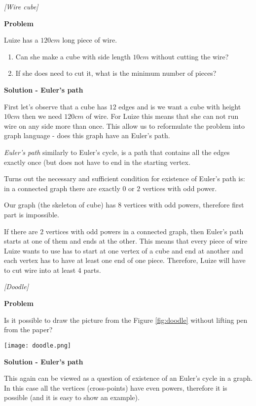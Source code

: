 %
\filbreak
\begin{problem}
\textit{[Wire cube]}

\textbf{Problem}

Luize has a $120cm$ long piece of wire.
\begin{enumerate}
\item Can she make a cube with side length $10cm$ without cutting the wire?
\item If she does need to cut it, what is the minimum number of pieces?
\end{enumerate}

\textbf{Solution - Euler's path}

First let's observe that a cube has $12$ edges and is we want a cube with height $10cm$ then we need $120cm$ of wire. For Luize this means that she can not run wire on any side more than once. 
This allow us to reformulate the problem into graph language - does this graph have an Euler's path. 

\textit{Euler's path} similarly to Euler's cycle, is a path that contains all the edges exactly once (but does not have to end in the starting vertex.

Turns out the necessary and sufficient condition for existence of Euler's path is: in a connected graph there are exactly $0$ or $2$ vertices with odd power. 

Our graph (the skeleton of cube) has $8$ vertices with odd powers, therefore first part is impossible. 

If there are $2$ vertices with odd powers in a connected graph, then Euler's path starts at one of them and ends at the other. This means that every piece of wire Luize wants to use has to start at one vertex of a cube and end at another and each vertex has to have at least one end of one piece. Therefore, Luize will have to cut wire into at least $4$ parts.

\end{problem}
%
\filbreak
\begin{problem}
\textit{[Doodle]}

\textbf{Problem}

Is it possible to draw the picture from the Figure \ref{fig:doodle} without lifting pen from the paper?
\begin{center}
\texttt{[image: doodle.png]}
\label{fig:doodle}
\end{center} 

\textbf{Solution - Euler's path}

This again can be viewed as a question of existence of an Euler's cycle in a graph. In this case all the vertices (cross-points) have even powers, therefore it is possible (and it is easy to show an example).
\end{problem}

